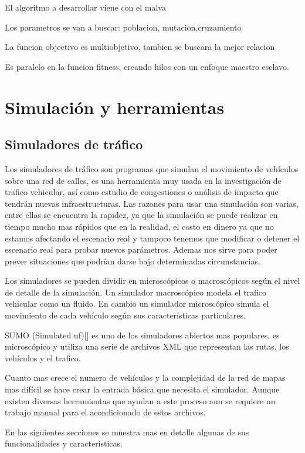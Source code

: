 El algoritmo a desarrollar viene con el malva

Los parametros se van a buscar: poblacion, mutacion,cruzamiento

La funcion objectivo es multiobjetivo, tambien se buscara la mejor relacion

Es paralelo en la funcion fitness, creando hilos
con un enfoque maestro esclavo.




\section{Simulación y herramientas}

\subsection{Simuladores de tráfico}
Los simuladores de tráfico son programas que simulan el movimiento de vehículos sobre una red de calles, es una herramienta muy usada en la investigación de trafico vehicular, así como estudio de congestiones o análisis de impacto que tendrán nuevas infraestructuras.  Las razones para usar una simulación son varias, entre ellas se encuentra  la rapidez, ya que la simulación se puede realizar en tiempo mucho mas rápidos que en la realidad, el costo en dinero ya que no estamos afectando el escenario real  y tampoco tenemos que modificar o detener el escenario real para probar nuevos parámetros. Ademas nos sirve para poder prever situaciones que podrían darse bajo determinadas circunstancias.

Los simuladores se pueden dividir en microscópicos o macroscópicos según el nivel de detalle de la simulación. Un simulador macroscópico modela  el trafico vehicular como un fluido. En cambio un simulador microscópico simula el movimiento de cada vehículo según sus características particulares.

SUMO (Simulated uf)[] es uno de los simuladores abiertos mas populares, es microscópico y utiliza una serie de archivos  XML que representan las rutas, los vehículos y el trafico.  

Cuanto mas crece el numero de vehículos y la complejidad de la red de mapas mas difícil se hace crear la entrada básica que necesita el simulador. Aunque existen diversas herramientas que ayudan a este proceso aun se requiere un trabajo manual para el acondicionado de estos archivos.

En las siguientes secciones se muestra mas en detalle algunas de sus funcionalidades y características.


